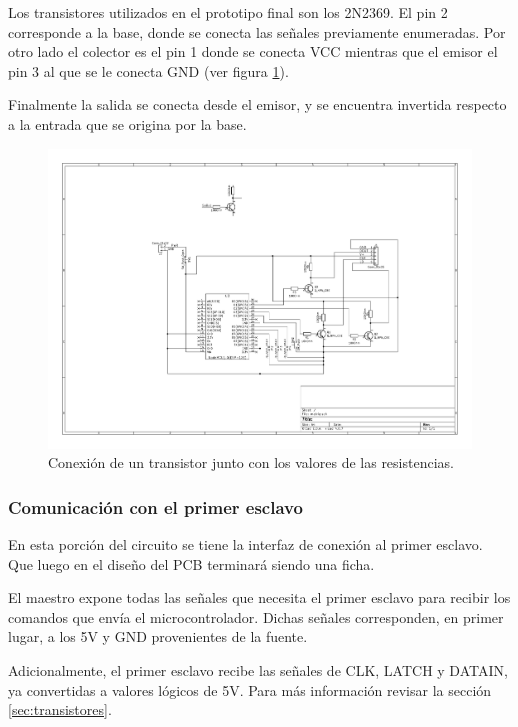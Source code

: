 Los transistores utilizados en el prototipo final son los 2N2369. %
El pin 2 corresponde a la base, donde se conecta las señales previamente enumeradas. Por otro lado el colector es el pin 1 donde se conecta VCC mientras que el emisor el pin 3 al que se le conecta GND (ver figura \ref{fig:transistors}).

Finalmente la salida se conecta desde el emisor, y se encuentra invertida respecto a la entrada que se origina por la base.

\begin{figure}[ht!]
	\centering
	\begin{center}
		\includegraphics[scale=2]{imagenes/hw/transistor.pdf}
		\caption{Conexión de un transistor junto con los valores de las resistencias.}
		\label{fig:transistors}
	\end{center}
\end{figure}

\subsubsection{Comunicación con el primer esclavo} \label{sec:ficha-esclavo}
En esta porción del circuito se tiene la interfaz de conexión al primer esclavo. 
Que luego en el diseño del PCB terminará siendo una ficha.

El maestro expone todas las señales que necesita el primer esclavo para recibir los comandos que envía el microcontrolador.
Dichas señales corresponden, en primer lugar, a los 5V y GND provenientes de la fuente.

Adicionalmente, el primer esclavo recibe las señales de CLK, LATCH y DATAIN, ya convertidas a valores lógicos de 5V. Para más información revisar la sección \ref{sec:transistores}.

